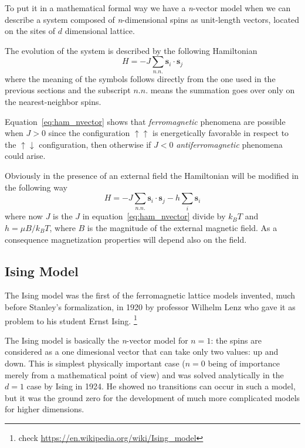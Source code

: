 To put it in a mathematical formal way we have a \textit{n}-vector model when we
can describe a system composed of \textit{n}-dimensional spins as unit-length
vectors, located on the sites of $d$ dimensional lattice.

The evolution of the system is described by the following Hamiltonian
\begin{equation}
	H = - J \sum_{n.n.} \mathbf{s}_i \cdot \mathbf{s}_j
	\label{eq:ham_nvector}
\end{equation}
where the meaning of the symbols follows directly from the one used in the
previous sections and the subscript $n.n.$ means the summation goes over only
on the nearest-neighbor spins. 

Equation~\ref{eq:ham_nvector} shows that \emph{ferromagnetic} phenomena are  
possible when $J > 0$ since the configuration $\uparrow\uparrow$ is 
energetically favorable in respect to the $\uparrow\downarrow$ configuration, 
then otherwise if $J < 0$ \emph{antiferromagnetic} phenomena could arise.

Obviously in the presence of an external field the Hamiltonian will be modified
in the following way
\begin{equation}
\label{eq:ham_field}
H = - J \sum_{n.n.} \mathbf{s}_i \cdot \mathbf{s}_j - h \sum_i \mathbf{s}_i 
\end{equation}
where now $J$ is the $J$ in equation~\ref{eq:ham_nvector} divide by $k_B T$ and $h =
\mu B / k_B T$, where $B$ is the magnitude of the external magnetic field. As a 
consequence magnetization properties will depend also on the field.


\subsection{Ising Model}

The Ising model was the first of the ferromagnetic lattice models invented, much 
before Stanley's formalization, in 1920 by professor Wilhelm Lenz who gave it as 
problem to his student Ernst Ising. \footnote{check \url{
https://en.wikipedia.org/wiki/Ising_model}}

The Ising model is basically the \textit{n}-vector model for $n=1$: the spins
are considered as a one dimesional vector that can take only two values: up and 
down. This is simplest physically important case ($n=0$ being of importance merely
from a mathematical point of view) and was solved analytically in the $d=1$ case by
Ising in 1924. He showed no transitions can occur in such a model, but it was the
ground zero for the development of much more complicated models for higher
dimensions.

